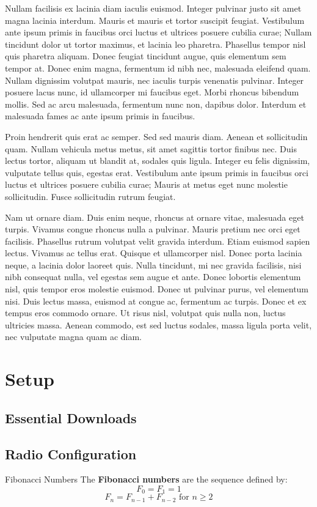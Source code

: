 \documentclass[12pt, letterpaper]{article}
\begin{document}
Nullam facilisis ex lacinia diam iaculis euismod. Integer pulvinar justo sit amet magna lacinia interdum. Mauris et mauris et tortor suscipit feugiat. Vestibulum ante ipsum primis in faucibus orci luctus et ultrices posuere cubilia curae; Nullam tincidunt dolor ut tortor maximus, et lacinia leo pharetra. Phasellus tempor nisl quis pharetra aliquam. Donec feugiat tincidunt augue, quis elementum sem tempor at. Donec enim magna, fermentum id nibh nec, malesuada eleifend quam. Nullam dignissim volutpat mauris, nec iaculis turpis venenatis pulvinar. Integer posuere lacus nunc, id ullamcorper mi faucibus eget. Morbi rhoncus bibendum mollis. Sed ac arcu malesuada, fermentum nunc non, dapibus dolor. Interdum et malesuada fames ac ante ipsum primis in faucibus.

Proin hendrerit quis erat ac semper. Sed sed mauris diam. Aenean et sollicitudin quam. Nullam vehicula metus metus, sit amet sagittis tortor finibus nec. Duis lectus tortor, aliquam ut blandit at, sodales quis ligula. Integer eu felis dignissim, vulputate tellus quis, egestas erat. Vestibulum ante ipsum primis in faucibus orci luctus et ultrices posuere cubilia curae; Mauris at metus eget nunc molestie sollicitudin. Fusce sollicitudin rutrum feugiat.

Nam ut ornare diam. Duis enim neque, rhoncus at ornare vitae, malesuada eget turpis. Vivamus congue rhoncus nulla a pulvinar. Mauris pretium nec orci eget facilisis. Phasellus rutrum volutpat velit gravida interdum. Etiam euismod sapien lectus. Vivamus ac tellus erat. Quisque et ullamcorper nisl. Donec porta lacinia neque, a lacinia dolor laoreet quis. Nulla tincidunt, mi nec gravida facilisis, nisi nibh consequat nulla, vel egestas sem augue et ante. Donec lobortis elementum nisl, quis tempor eros molestie euismod. Donec ut pulvinar purus, vel elementum nisi. Duis lectus massa, euismod at congue ac, fermentum ac turpis. Donec et ex tempus eros commodo ornare. Ut risus nisl, volutpat quis nulla non, luctus ultricies massa. Aenean commodo, est sed luctus sodales, massa ligula porta velit, nec vulputate magna quam ac diam.

\section{Setup}
\subsection{Essential Downloads}
\subsection{Radio Configuration}
\begin{definition}{Fibonacci Numbers}{}
    The \textbf{Fibonacci numbers} are the sequence defined by: 
    \[F_0 = F_1 = 1\]
    \[F_n = F_{n - 1} + F_{n - 2} \text{ for } n \geq 2\]
\end{definition}
\end{document}
